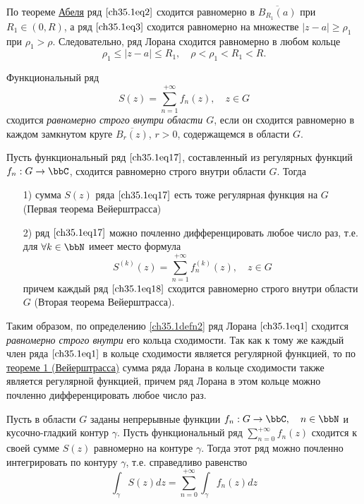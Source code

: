 По теореме \hyperref[ch34.2Thm1]{Абеля} ряд $\eqref{ch35.1eq2}$ сходится равномерно в $\overline{B_{R_1}(a)}$ при 
$R_1 \in (0,R)$, а ряд $\eqref{ch35.1eq3}$ сходится равномерно на множестве $|z - a| \ge \rho_1$ при $\rho_1 > \rho$. Следовательно, ряд Лорана сходится равномерно в любом кольце
$$
\rho_1 \le |z - a| \le R_1, \quad \rho < \rho_1 < R_1 < R.
$$

\begin{defn}\label{ch35.1defn2} 
Функциональный ряд 
\begin{equation} \label{ch35.1eq17}
S(z)=\sum\limits_{n=1}^{+\infty} f_n(z), \quad z\in G
\end{equation}
 сходится \textit{равномерно строго внутри области $G$}, если он сходится равномерно в каждом замкнутом круге $\overline{B_r(z)}$, $r>0$, содержащемся в области $G$.
\end{defn}

\begin{thm}[Вейерштрасса] \label{ch35.1Thm5}
Пусть функциональный ряд $\eqref{ch35.1eq17}$, составленный из регулярных функций $f_n: G \to \bbC$, сходится равномерно строго внутри области $G$. Тогда
\begin{enumerate}
	\item[1)] {\rightskip=3.5cm} {сумма $S(z)$ ряда $\eqref{ch35.1eq17}$ есть тоже регулярная функция на $G$ (Первая теорема Вейерштрасса)
	}
	\item[2)] {\rightskip=0cm}{ряд $\eqref{ch35.1eq17}$ можно почленно дифференцировать любое число раз, т.е. для $\forall k \in \bbN$ имеет место формула 
	\begin{equation} \label{ch35.1eq18}
	S^{(k)}(z) = \sum\limits_{n=1}^{+\infty} f_{n}^{(k)}(z), \quad z \in G
	\end{equation}
	причем каждый ряд $\eqref{ch35.1eq18}$ сходится равномерно строго внутри области $G$ (Вторая теорема Вейерштрасса).	}
\end{enumerate}
\end{thm}

Таким образом, по определению \ref{ch35.1defn2} ряд Лорана $\eqref{ch35.1eq1}$ сходится \textit{равномерно строго внутри} его кольца сходимости. Так как к тому же каждый член ряда $\eqref{ch35.1eq1}$ в кольце сходимости является регулярной функцией, то по  \hyperref[ch35.1Thm5]{теореме 1 (Вейерштрасса)} сумма ряда Лорана в кольце сходимости также является регулярной функцией, причем ряд Лорана в этом кольце можно почленно дифференцировать любое число раз.

\begin{thm} \label{ch35.1Thm6}
Пусть в области $G$ заданы непрерывные функции $f_n: G \to \bbC,\quad n \in \bbN$ и кусочно-гладкий контур $\gamma$. Пусть функциональный ряд $\sum\limits_{n=0}^{+\infty} f_n(z)$ сходится к своей сумме $S(z)$ равномерно на контуре $\gamma$. Тогда этот ряд можно почленно интегрировать по контуру $\gamma$, т.е. справедливо равенство
\begin{equation}
\int_{\gamma} S(z)dz = \sum\limits_{n=0}^{+\infty} \int_{\gamma} f_n(z)dz
\end{equation}
\end{thm} 

